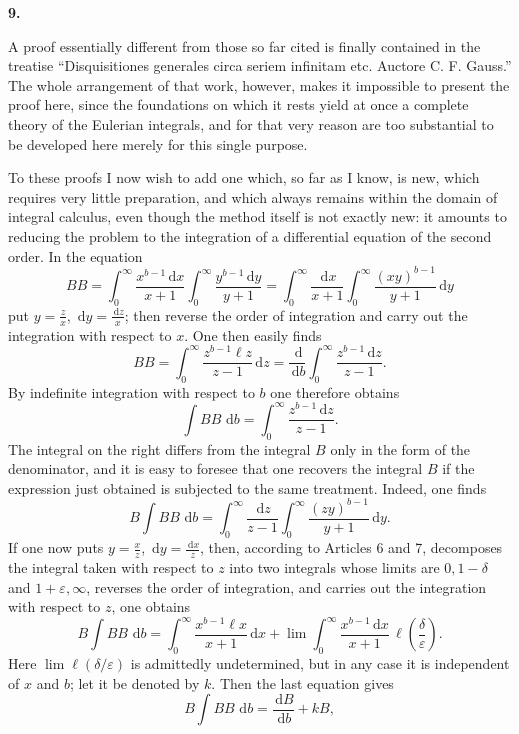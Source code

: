 \documentclass[11pt]{article}
\newcommand{\dd}{\,\mathrm d}
\newcommand{\art}[1]{\bigskip\begin{center}\large\bfseries #1.\end{center}\nopagebreak}
\begin{document}
\art{9}

A proof essentially different from those so far cited is finally contained in the treatise “Disquisitiones generales circa seriem infinitam etc. Auctore C. F. Gauss.” The whole arrangement of that work, however, makes it impossible to present the proof here, since the foundations on which it rests yield at once a complete theory of the Eulerian integrals, and for that very reason are too substantial to be developed here merely for this single purpose.

To these proofs I now wish to add one which, so far as I know, is new, which requires very little preparation, and which always remains within the domain of integral calculus, even though the method itself is not exactly new: it amounts to reducing the problem to the integration of a differential equation of the second order. In the equation
\[
B B=\int_0^\infty\frac{x^{b-1}\dd x}{x+1}
     \int_0^\infty\frac{y^{b-1}\dd y}{y+1}
=\int_0^\infty\frac{\dd x}{x+1}
     \int_0^\infty\frac{(xy)^{b-1}}{y+1}\dd y
\]
put $y=\frac zx$, $\dd y=\frac{\dd z}{x}$; then reverse the order of integration and carry out the integration with respect to $x$. One then easily finds
\begin{equation}
B B=\int_0^\infty\frac{z^{b-1}\ell z}{z-1}\dd z
=\frac{\dd}{\dd b}\int_0^\infty\frac{z^{b-1}\dd z}{z-1}.
\tag{27}
\end{equation}
By indefinite integration with respect to $b$ one therefore obtains
\[
\int B B\,\dd b=\int_0^\infty\frac{z^{b-1}\dd z}{z-1}.
\]
The integral on the right differs from the integral $B$ only in the form of the denominator, and it is easy to foresee that one recovers the integral $B$ if the expression just obtained is subjected to the same treatment. Indeed, one finds
\[
B\int B B\,\dd b
=\int_0^\infty\frac{\dd z}{z-1}
  \int_0^\infty\frac{(zy)^{b-1}}{y+1}\dd y.
\]
If one now puts $y=\frac xz$, $\dd y=\frac{\dd x}{z}$, then, according to Articles 6 and 7, decomposes the integral taken with respect to $z$ into two integrals whose limits are $0,1-\delta$ and $1+\varepsilon,\infty$, reverses the order of integration, and carries out the integration with respect to $z$, one obtains
\[
B\int B B\,\dd b
=\int_0^\infty\frac{x^{b-1}\ell x}{x+1}\dd x
+\lim\int_0^\infty\frac{x^{b-1}\dd x}{x+1}\,\ell\!\left(\frac{\delta}{\varepsilon}\right).
\]
Here $\lim \ell(\delta/\varepsilon)$ is admittedly undetermined, but in any case it is independent of $x$ and $b$; let it be denoted by $k$. Then the last equation gives
\[
B\int B B\,\dd b=\frac{\dd B}{\dd b}+kB,
\]
\end{document}
